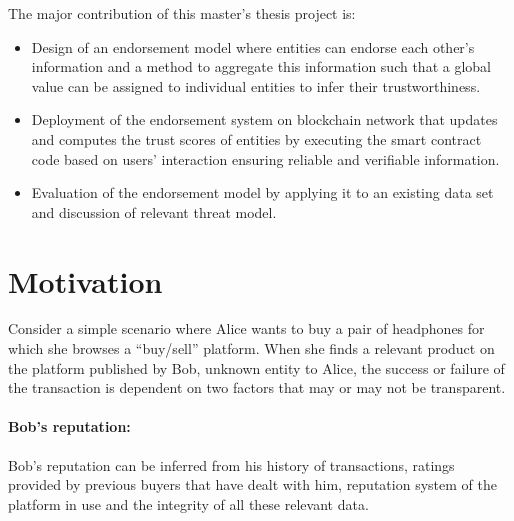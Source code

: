 The major contribution of this master's thesis project is:
\begin{itemize}
	\item Design of an endorsement model where entities can endorse each
		other's information and a method to aggregate this information such
		that a global value can be assigned to individual entities to infer
		their trustworthiness. 
	\item Deployment of the endorsement system on blockchain network that
		updates and computes the trust scores of entities by executing the
		smart contract code based on users' interaction ensuring reliable and
		verifiable information. 
	\item Evaluation of the endorsement model by applying it to an existing
		data set and discussion of relevant threat model.
\end{itemize}


 
\section{Motivation}
Consider a simple scenario where Alice wants to buy a pair of headphones for
which she browses a ``buy/sell'' platform. When she finds a relevant product on the
platform published by Bob, unknown entity to Alice, the success or failure of
the transaction is dependent on two factors that may or may not be transparent.
\paragraph{Bob's reputation:}Bob's reputation can be inferred from his history
of transactions, ratings provided by previous buyers that have dealt with him,
reputation system of the platform in use and the integrity of all these
relevant data.  
